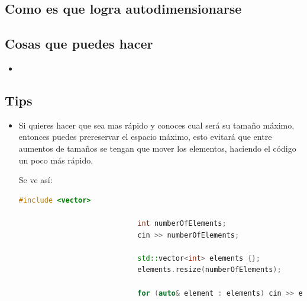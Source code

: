 \documentclass[12pt, fleqn]{report}                             %
\theoremstyle{break}                                            %
\begin{document}
            \subsection{Como es que logra autodimensionarse}



            \subsection{Cosas que puedes hacer}

                \begin{itemize}
                    \item 
                \end{itemize}
               

            \subsection{Tips}

                \begin{itemize}
                    \item Si quieres hacer que sea mas rápido y conoces cual será su tamaño máximo,
                        entonces puedes prereservar el espacio máximo, esto evitará que entre aumentos de tamaños
                        se tengan que mover los elementos, haciendo el código un poco más rápido.

                        Se ve así:
                        \begin{lstlisting}[language=C++, gobble=28]
                            #include <vector>

                            int numberOfElements;
                            cin >> numberOfElements;

                            std::vector<int> elements {};
                            elements.resize(numberOfElements);

                            for (auto& element : elements) cin >> element;
                        \end{lstlisting}
                

                \end{itemize}
\end{document}
